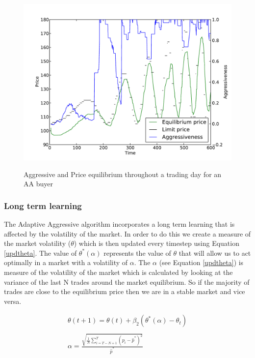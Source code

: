 \documentclass{acm_proc_article-sp}
\begin{document}
\begin{figure} 
  \centering
  \includegraphics[width=\columnwidth]{graphs_and_stats/aggressiveness_vs_price.pdf}
  \label{aavtime}
  \caption{Aggressive and Price equilibrium throughout a trading day for an AA
  buyer}
\end{figure}

\subsubsection{Long term learning} \label{sec:AA_long_term_learning}
The Adaptive Aggressive algorithm incorporates a long term learning that is
affected by the volatility of the market. In order to do this we create a
measure of the market volatility ($\theta$) which is then updated every
timestep using Equation \ref{updtheta}. The value of $\theta^*(\alpha)$
represents the value of $\theta$ that will allow us to act optimally in a
market with a volatility of $\alpha$.  The $\alpha$ (see Equation
\ref{updtheta}) is measure of the volatility of the market which is calculated
by looking at the variance of the last N trades around the market equilibrium.
So if the majority of trades are close to the equilibrium price then we are in
a stable market and vice versa.

\begin{equation}
\label{updtheta}
\begin{split}
\theta(t+1)=\theta(t)+\beta_2(\theta^*(\alpha)-\theta_t)\\\\
\alpha = \frac{\sqrt{\frac 1 N \sum^T_{i=T-N+1}(p_i-\hat p^*)^2}}{\hat p^*}
\end{split}
\end{equation}
\end{document}
